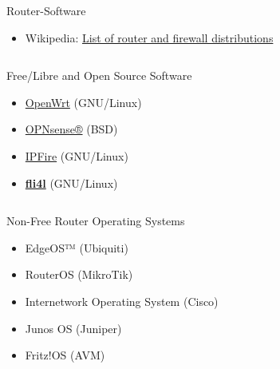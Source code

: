 \documentclass[t]{beamer}
\makeatletter
\newcommand{\strong}[1]{\@strong{#1}}
\newcommand{\@@strong}[1]{\textbf{\let\@strong\@@@strong#1}}
\newcommand{\@@@strong}[1]{\textnormal{\let\@strong\@@strong#1}}
\let\@strong\@@strong
\makeatother
\begin{document}
\begin{frame}{Router-Software}
    \begin{itemize}
        \item Wikipedia: \href{https://en.wikipedia.org/wiki/List_of_router_and_firewall_distributions}{List of router and firewall distributions}
    \end{itemize}
    \begin{columns}[c,onlytextwidth]
        \begin{column}{0.65\textwidth}
            \begin{exampleblock}{Free/Libre and Open Source Software}
                \begin{itemize}
                    \item \href{https://openwrt.org/}{OpenWrt} (GNU/Linux)
                    \item \href{https://opnsense.org/}{OPNsense®} (BSD)
                    \item \href{https://www.ipfire.org/}{IPFire} (GNU/Linux)
                    \item \strong{\href{https://www.fli4l.de/}{fli4l}} (GNU/Linux)
                \end{itemize}
            \end{exampleblock}
        \end{column}
        \begin{column}{0.32\textwidth}
            
        \end{column}
    \end{columns}
    \begin{alertblock}{Non-Free Router Operating Systems}
        \begin{itemize}
            \item EdgeOS™ (Ubiquiti)
            \item RouterOS (MikroTik)
            \item Internetwork Operating System (Cisco)
            \item Junos OS (Juniper)
            \item Fritz!OS (AVM)
        \end{itemize}
    \end{alertblock}
\end{frame}
\end{document}
